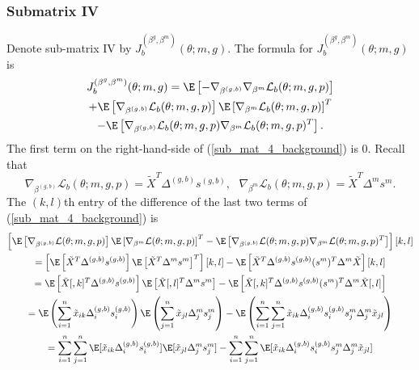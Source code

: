 \documentclass[12pt]{article}
\begin{document}
\begin{appendices}
\subsubsection*{Submatrix IV}
Denote sub-matrix IV by $J_b^{(\beta^g, \beta^m)}(\theta; m, g)$. The formula for $J_b^{(\beta^g, \beta^m)}(\theta; m, g)$ is 
\begin{multline}\label{sub_mat_4_background}
J_b^{(\beta^g, \beta^m)}(\theta; m,g) = \E \left[-\nabla_{\beta^{(g,b)}} \nabla_{\beta^m} \mathcal{L}_b(\theta; m, g, p) \right] \\ + \E\left[ \nabla_{\beta^{(g,b)}}\mathcal{L}_b(\theta ; m,g,p) \right] \E \left[\nabla_{\beta^m}\mathcal{L}_b (\theta ; m,g,p)  \right]^T \\ - \E \left[ \nabla_{\beta^{(g,b)}}\mathcal{L}_b (\theta; m,g,p) \nabla_{\beta^m}\mathcal{L}_b(\theta; m,g,p)^T  \right].
\end{multline} The first term on the right-hand-side of (\ref{sub_mat_4_background}) is $0$. Recall that $$\nabla_{\beta^{(g,b)}} \mathcal{L}_b(\theta; m, g, p) =   \tilde{X}^T\Delta^{(g,b)} s^{(g,b)}, \textrm{		} \nabla_{\beta^m} \mathcal{L}_b(\theta; m, g, p) = \tilde{X}^T \Delta^m s^m.$$ The $(k,l)$th entry of the difference of the last two terms of (\ref{sub_mat_4_background}) is
\begin{multline*}
\left[ \E \left[\nabla_{\beta^{(g,b)}} \mathcal{L}(\theta; m, g, p) \right] \E \left[\nabla_{\beta^m} \mathcal{L}(\theta; m, g, p) \right]^T - \E \left[ \nabla_{\beta^{(g,b)}} \mathcal{L}(\theta; m, g, p) \nabla_{\beta^m} \mathcal{L}(\theta; m, g, p)^T \right] \right][k,l] \\ 
= \left[ \E \left[ \tilde{X}^T \Delta^{(g,b)} s^{(g,b)} \right]\E \left[ \tilde{X}^T \Delta^m s^m \right]^T\right][k,l] - \E \left[ \tilde{X}^T \Delta^{(g,b)} s^{(g,b)} (s^m)^T \Delta^m \tilde{X} \right][k,l] \\ 
= \E\left[\tilde{X}[,k]^T \Delta^{(g,b)} s^{(g,b)} \right] \E \left[\tilde{X}[,l]^T \Delta^m s^m \right] - \E \left[\tilde{X}[,k]^T \Delta^{(g,b)} s^{(g,b)} (s^m)^T \Delta^m \tilde{X}[,l ] \right] \\
=\E\left( \sum_{i=1}^n \tilde{x}_{ik} \Delta^{(g,b)}_i s^{(g,b)}_i \right) \E \left( \sum_{j=1}^n \tilde{x}_{jl} \Delta^m_j s^m_j \right) - \E \left( \sum_{i=1}^n \sum_{j=1}^n \tilde{x}_{ik} \Delta^{(g,b)}_i s^{(g,b)}_i s^m_j \Delta^m_j \tilde{x}_{jl} \right) \\ 
= \sum_{i=1}^n \sum_{j=1}^n \E[\tilde{x}_{ik} \Delta^{(g,b)}_is^{(g,b)}_i] \E[ \tilde{x}_{jl} \Delta^m_j s^m_j ] - \sum_{i=1}^n \sum_{j=1}^n \E[ \tilde{x}_{ik} \Delta^{(g,b)}_i s^{(g,b)}_i s^m_j \Delta^m_j \tilde{x}_{jl}]  \\

\end{multline*}
\end{appendices}
\end{document}
